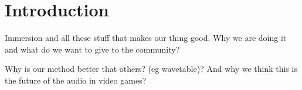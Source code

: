 \chapter{Introduction}
\mbox{}\par
Immersion and all these stuff that makes our thing good. Why we are doing it and what do we want to give to the community?
\par
Why is our method better that others? (eg wavetable)? And why we think this is the future of the audio in video games?